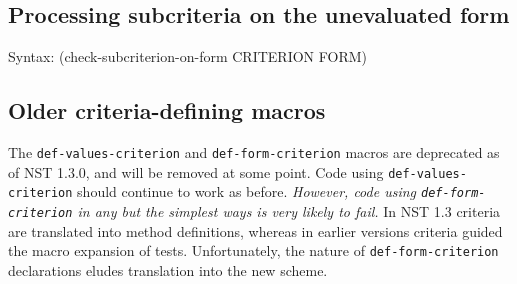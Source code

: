 % 
% 

\subsection{Processing subcriteria on the unevaluated form}
\label{sec:subcriteria-form}
{\ttfamily\begin{tabbing}
\textrm{Syntax: }(check-subcriterion-on-form CRITERION FORM)
\end{tabbing}}

\subsection{Older criteria-defining macros}
\label{sec:def-values-criterion}
\label{sec:def-form-criterion}
The \texttt{def-values-criterion} and \texttt{def-form-criterion}
macros are deprecated as of NST 1.3.0, and will be removed at some
point.  Code using \texttt{def-values- criterion} should continue to
work as before.  \emph{However, code using \texttt{def-form-
    criterion} in any but the simplest ways is very likely to fail.}
%
In NST 1.3 criteria are translated into method definitions, whereas in
earlier versions criteria guided the macro expansion of tests.
Unfortunately, the nature of \texttt{def-form-criterion} declarations
eludes translation into the new scheme.

